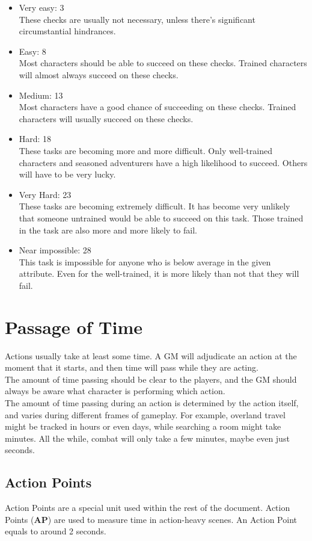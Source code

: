 \begin{itemize}
    \item Very easy: 3\\
    These checks are usually not necessary, unless there's significant circumstantial hindrances.
    \item Easy: 8\\
    Most characters should be able to succeed on these checks.
    Trained characters will almost always succeed on these checks.
    \item Medium: 13\\
    Most characters have a good chance of succeeding on these checks.
    Trained characters will usually succeed on these checks.
    \item Hard: 18\\
    These tasks are becoming more and more difficult.
    Only well-trained characters and seasoned adventurers have a high likelihood to succeed.
    Others will have to be very lucky.
    \item Very Hard: 23\\
    These tasks are becoming extremely difficult.
    It has become very unlikely that someone untrained would be able to succeed on this task.
    Those trained in the task are also more and more likely to fail.
    \item Near impossible: 28\\
    This task is impossible for anyone who is below average in the given attribute.
    Even for the well-trained, it is more likely than not that they will fail.
\end{itemize}

\section{Passage of Time}\label{sec:passageOfTime}
Actions usually take at least some time.
A GM will adjudicate an action at the moment that it starts, and then time will pass while they are acting.\\
The amount of time passing should be clear to the players, and the GM should always be aware what character is performing which action.\\
The amount of time passing during an action is determined by the action itself, and varies during different frames of gameplay.
For example, overland travel might be tracked in hours or even days, while searching a room might take minutes.
All the while, combat will only take a few minutes, maybe even just seconds.

\subsection{Action Points}\label{subsec:actionPoints}
Action Points are a special unit used within the rest of the document.
Action Points (\textbf{AP}) are used to measure time in action-heavy scenes.
An Action Point equals to around 2 seconds.






